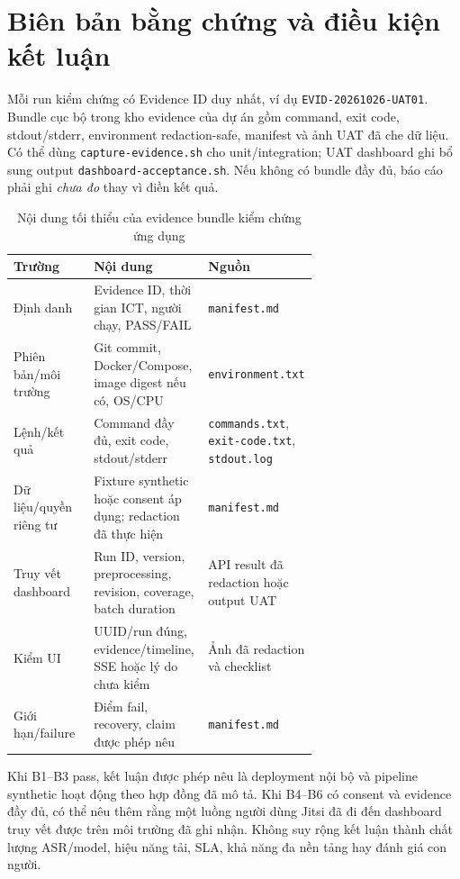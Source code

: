 \section{Biên bản bằng chứng và điều kiện kết luận}

Mỗi run kiểm chứng có Evidence ID duy nhất, ví dụ \texttt{EVID-20261026-UAT01}. Bundle cục bộ trong kho evidence của dự án gồm command, exit code, stdout/stderr, environment redaction-safe, manifest và ảnh UAT đã che dữ liệu. Có thể dùng \texttt{capture-evidence.sh} cho unit/integration; UAT dashboard ghi bổ sung output \texttt{dashboard-acceptance.sh}. Nếu không có bundle đầy đủ, báo cáo phải ghi \emph{chưa đo} thay vì điền kết quả.

\begin{table}[H]
\centering
\caption{Nội dung tối thiểu của evidence bundle kiểm chứng ứng dụng}
\label{tab:application-evidence-bundle}
\begin{tabularx}{\linewidth}{p{0.29\linewidth}p{0.38\linewidth}X}
\toprule
Trường & Nội dung & Nguồn \\ \midrule
Định danh & Evidence ID, thời gian ICT, người chạy, PASS/FAIL & \texttt{manifest.md} \\
Phiên bản/môi trường & Git commit, Docker/Compose, image digest nếu có, OS/CPU & \texttt{environment.\allowbreak txt} \\
Lệnh/kết quả & Command đầy đủ, exit code, stdout/stderr & \texttt{commands.txt}, \texttt{exit-code.txt}, \texttt{stdout.log} \\
Dữ liệu/quyền riêng tư & Fixture synthetic hoặc consent áp dụng; redaction đã thực hiện & \texttt{manifest.md} \\
Truy vết dashboard & Run ID, version, preprocessing, revision, coverage, batch duration & API result đã redaction hoặc output UAT \\
Kiểm UI & UUID/run đúng, evidence/timeline, SSE hoặc lý do chưa kiểm & Ảnh đã redaction và checklist \\
Giới hạn/failure & Điểm fail, recovery, claim được phép nêu & \texttt{manifest.md} \\
\bottomrule
\end{tabularx}
\end{table}

Khi B1--B3 pass, kết luận được phép nêu là deployment nội bộ và pipeline synthetic hoạt động theo hợp đồng đã mô tả. Khi B4--B6 có consent và evidence đầy đủ, có thể nêu thêm rằng một luồng người dùng Jitsi đã đi đến dashboard truy vết được trên môi trường đã ghi nhận. Không suy rộng kết luận thành chất lượng ASR/model, hiệu năng tải, SLA, khả năng đa nền tảng hay đánh giá con người.
